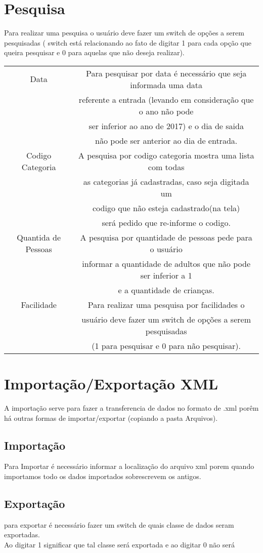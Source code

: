 \documentclass[titlepage]{article}
\begin{document}
				\section{Pesquisa}
				Para realizar uma pesquisa o usuário deve fazer um switch de opções a serem pesquisadas ( switch está relacionando ao fato de digitar 1 para cada opção que queira pesquisar e 0 para aquelas que não deseja realizar).\\
				\begin{table}[h]%
					\begin{tabular}{|c|c|}
					\hline
					Data&Para pesquisar por data é necessário que seja informada uma data \\&referente a entrada (levando em consideração que o ano não pode\\& ser inferior ao ano de 2017) e o dia de saida\\&não pode ser  anterior ao dia de entrada.\\
					\hline
					Codigo Categoria&A pesquisa por codigo categoria  mostra uma lista com todas\\& as categorias já cadastradas, caso seja digitada um\\& codigo que não esteja cadastrado(na tela)\\& será pedido que re-informe o codigo.\\
					\hline
					Quantida de Pessoas&A pesquisa por quantidade de pessoas pede para o usuário \\& informar a quantidade de adultos que não pode ser inferior a 1  \\& e a quantidade de crianças.\\
					\hline
					Facilidade&Para realizar uma pesquisa por facilidades  o\\& usuário deve fazer um switch de opções a serem pesquisadas\\&(1 para pesquisar e 0 para não pesquisar).\\
					\hline
					\end{tabular}
				\end{table}


				\newpage
				\section{Importação/Exportação XML}
				A importação serve para fazer a transferencia de dados no formato de .xml porêm há outras formas de importar/exportar (copiando a pasta Arquivos).\\
				\subsection{Importação}
				Para Importar é necessário informar a localização do arquivo xml porem quando importamos todo os dados importados sobrescrevem os antigos.\\
				\subsection{Exportação}
				para exportar é necessário fazer um switch de quais  classe de dados seram exportadas.\\Ao digitar 1 significar que tal classe será exportada e ao digitar 0 não será 








	
\end{document}
